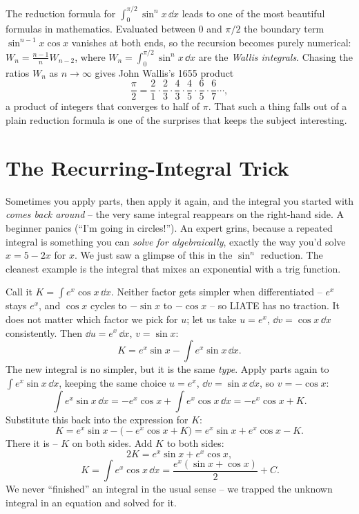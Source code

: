 \begin{connectionbox}
The reduction formula for $\int_0^{\pi/2}\sin^n x\,\dd x$ leads to one of the most
beautiful formulas in mathematics. Evaluated between $0$ and $\pi/2$ the boundary
term $\sin^{n-1}x\cos x$ vanishes at both ends, so the recursion becomes purely
numerical: $W_n = \frac{n-1}{n}W_{n-2}$, where $W_n = \int_0^{\pi/2}\sin^n x\,\dd
x$ are the \emph{Wallis integrals}. Chasing the ratios $W_n$ as $n\to\infty$
gives John Wallis's 1655 product
\[
\frac{\pi}{2} = \frac{2}{1}\cdot\frac{2}{3}\cdot\frac{4}{3}\cdot\frac{4}{5}
\cdot\frac{6}{5}\cdot\frac{6}{7}\cdots,
\]
a product of integers that converges to half of $\pi$. That such a thing falls
out of a plain reduction formula is one of the surprises that keeps the subject
interesting.
\end{connectionbox}

\section{The Recurring-Integral Trick}
\label{ch23:recurring}

Sometimes you apply parts, then apply it again, and the integral you started with
\emph{comes back around} -- the very same integral reappears on the right-hand
side. A beginner panics (``I'm going in circles!''). An expert grins, because a
repeated integral is something you can \emph{solve for algebraically}, exactly the
way you'd solve $x = 5 - 2x$ for $x$. We just saw a glimpse of this in the
$\sin^n$ reduction. The cleanest example is the integral that mixes an
exponential with a trig function.

\begin{example}
\label{ch23:ex-excos}
Call it $K = \int e^x\cos x\,\dd x$. Neither factor gets simpler when
differentiated -- $e^x$ stays $e^x$, and $\cos x$ cycles to $-\sin x$ to
$-\cos x$ -- so LIATE has no traction. It does not matter which factor we pick for
$u$; let us take $u = e^x$, $\dd v = \cos x\,\dd x$ consistently. Then
$\dd u = e^x\,\dd x$, $v = \sin x$:
\[
K = e^x\sin x - \int e^x\sin x\,\dd x.
\]
The new integral is no simpler, but it is the same \emph{type}. Apply parts again
to $\int e^x\sin x\,\dd x$, keeping the same choice $u = e^x$,
$\dd v = \sin x\,\dd x$, so $v = -\cos x$:
\[
\int e^x\sin x\,\dd x = -e^x\cos x + \int e^x\cos x\,\dd x = -e^x\cos x + K.
\]
Substitute this back into the expression for $K$:
\[
K = e^x\sin x - \big(-e^x\cos x + K\big) = e^x\sin x + e^x\cos x - K.
\]
There it is -- $K$ on both sides. Add $K$ to both sides:
\[
2K = e^x\sin x + e^x\cos x,
\]
\[
\boxed{\,K = \int e^x\cos x\,\dd x = \frac{e^x(\sin x + \cos x)}{2} + C.}
\]
We never ``finished'' an integral in the usual sense -- we trapped the unknown
integral in an equation and solved for it.
\end{example}

